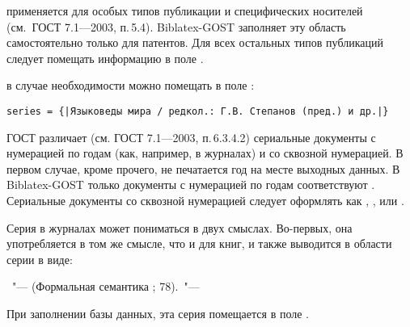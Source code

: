 \documentclass[10pt,a4paper,headings=small,numbers=enddot,english,russian]{ltxdockit}
\newcommand*{\biblatexgost}{Biblatex-GOST\xspace}
\newcommand*{\gostbibname}[1][]{ГОСТ#1 7.1---2003\xspace}
\newcommand*{\gostbibref}[2][]{\gostbibname[#1], п.\,#2\xspace}
\newcommand*{\notimpl}{\footnote{Не реализовано в данной версии \biblatexgost.}}
\newenvironment{bibexample}{\begin{list}
     {}
     {\setlength{\leftmargin}{\parindent}%
      \setlength{\itemindent}{-\leftmargin}%
      \setlength{\parsep}{0pt}}}
  {\end{list}}
\begin{document}
\begin{description}
%
%
\item[Область специфических сведений] применяется для
особых типов публикации и специфических носителей (см.~\gostbibref{5.4}).
\biblatexgost заполняет эту область самостоятельно только для
патентов.
Для всех остальных типов публикаций
следует помещать информацию в поле .


\item[Cведения об ответственности серии] в случае необходимости можно помещать
в поле :
\begin{lstlisting}[style=bibtex,escapechar=|]
series = {|Языковеды мира / редкол.: Г.В. Степанов (пред.) и др.|}
\end{lstlisting}

\item[Серия.] \label{series}ГОСТ различает (см. \gostbibref{6.3.4.2}) сериальные документы
с нумерацией по годам
(как, например, в журналах) и со сквозной нумерацией. В первом случае, кроме прочего,
не печатается год на месте выходных данных. В \biblatexgost только документы
с нумерацией по годам соответствуют .  Сериальные документы со
сквозной нумерацией следует оформлять как , ,
 или .

Серия в журналах может пониматься в двух смыслах. Во-первых, она употребляется в
том же смысле, что и для книг, и также выводится в области серии в виде:

\begin{bibexample}
\item \textellipsis~"--- (Формальная семантика ; 78).~"--- \textellipsis
\end{bibexample}

При заполнении базы данных, эта серия помещается в поле .


\end{description}
\end{document}
